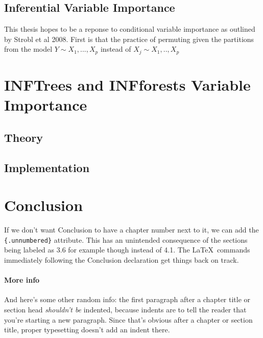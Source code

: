 \documentclass[12pt,twoside]{reedthesis}
\begin{document}
  \section{Inferential Variable
  Importance}\label{inferential-variable-importance}
  
  This thesis hopes to be a reponse to conditional variable importance as
  outlined by Strobl et al 2008. First is that the practice of permuting
  given the partitions from the model \(Y \sim X_1,...,X_p\) instead of
  \(X_j \sim X_1,..,X_p\)
  
  \chapter{INFTrees and INFforests Variable
  Importance}\label{inftrees-and-infforests-variable-importance}
  
  \section{Theory}\label{theory}
  
  \section{Implementation}\label{implementation}
  
  \chapter*{Conclusion}\label{conclusion}
  
  \setcounter{chapter}{4} \setcounter{section}{0}
  
  If we don't want Conclusion to have a chapter number next to it, we can
  add the \texttt{\{.unnumbered\}} attribute. This has an unintended
  consequence of the sections being labeled as 3.6 for example though
  instead of 4.1. The \LaTeX~commands immediately following the Conclusion
  declaration get things back on track.
  
  \subsubsection{More info}\label{more-info}
  
  And here's some other random info: the first paragraph after a chapter
  title or section head \emph{shouldn't be} indented, because indents are
  to tell the reader that you're starting a new paragraph. Since that's
  obvious after a chapter or section title, proper typesetting doesn't add
  an indent there.
  
\end{document}
